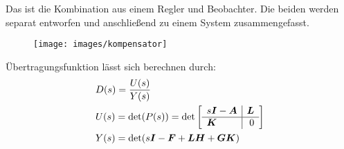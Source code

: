 
\begin{tcolorbox}[colback=white!10!white,colframe=green!30!black,title=Kompensator] 
Das ist die Kombination aus einem Regler und Beobachter. Die beiden werden separat entworfen und anschließend zu einem System zusammengefasst.
\begin{figure}[H]
\centering
\texttt{[image: images/kompensator]}
\caption{}
\label{fig:kompensator}
\end{figure}
Übertragungsfunktion lässt sich berechnen durch:
\begin{align*}
    &D(s) = \frac{U(s)}{Y(s)}\\
    &U(s) = \det(P(s)) = \det\left[\begin{array}{l|r}
    s\boldsymbol{I}- \boldsymbol{A} & \boldsymbol{L}\\\hline
    \boldsymbol{K} & 0
    \end{array}\right]\\
    &Y(s) = \det(s\boldsymbol{I}-\boldsymbol{F}+\boldsymbol{LH}+\boldsymbol{GK})
\end{align*} 

\end{tcolorbox}
